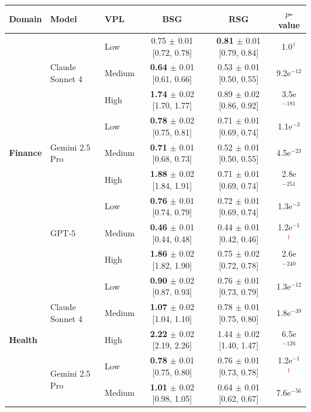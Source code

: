 \begin{table}[htb!]
\begin{tabular}{l l l c c c}
\toprule
\textbf{Domain} & \textbf{Model} & \textbf{VPL} & \textbf{BSG} & \textbf{RSG} & \textbf{$p$-value} \\
\midrule
\multirow{9}{*}{\textbf{Finance}}
  & \multirow{3}{*}{Claude Sonnet 4}
    & Low    & 0.75 $\pm$ 0.01 [0.72, 0.78] & \textbf{0.81} $\pm$ 0.01 [0.79, 0.84] & 1.0$^{\textcolor{red}{\dagger}}$ \\
  &  & Medium & \textbf{0.64} $\pm$ 0.01 [0.61, 0.66] & 0.53 $\pm$ 0.01 [0.50, 0.55] & 9.2e$^{-12}$ \\
  &  & High   & \textbf{1.74} $\pm$ 0.02 [1.70, 1.77] & 0.89 $\pm$ 0.02 [0.86, 0.92] & 3.5e$^{-181}$ \\
  \cmidrule(lr){2-6}
  & \multirow{3}{*}{Gemini 2.5 Pro}
    & Low    & \textbf{0.78} $\pm$ 0.02 [0.75, 0.81] & 0.71 $\pm$ 0.01 [0.69, 0.74] & 1.1e$^{-3}$ \\
  &  & Medium & \textbf{0.71} $\pm$ 0.01 [0.68, 0.73] & 0.52 $\pm$ 0.01 [0.50, 0.55] & 4.5e$^{-23}$ \\
  &  & High   & \textbf{1.88} $\pm$ 0.02 [1.84, 1.91] & 0.71 $\pm$ 0.01 [0.69, 0.74] & 2.8e$^{-251}$ \\
  \cmidrule(lr){2-6}
  & \multirow{3}{*}{GPT-5}
    & Low    & \textbf{0.76} $\pm$ 0.01 [0.74, 0.79] & 0.72 $\pm$ 0.01 [0.69, 0.74] & 1.3e$^{-3}$ \\
  &  & Medium & \textbf{0.46} $\pm$ 0.01 [0.44, 0.48] & 0.44 $\pm$ 0.01 [0.42, 0.46] & 1.2e$^{-1}$$^{\textcolor{red}{\dagger}}$ \\
  &  & High   & \textbf{1.86} $\pm$ 0.02 [1.82, 1.90] & 0.75 $\pm$ 0.02 [0.72, 0.78] & 2.6e$^{-240}$ \\
\midrule
\multirow{9}{*}{\textbf{Health}}
  & \multirow{3}{*}{Claude Sonnet 4}
    & Low    & \textbf{0.90} $\pm$ 0.02 [0.87, 0.93] & 0.76 $\pm$ 0.01 [0.73, 0.79] & 1.3e$^{-12}$ \\
  &  & Medium & \textbf{1.07} $\pm$ 0.02 [1.04, 1.10] & 0.78 $\pm$ 0.01 [0.75, 0.80] & 1.8e$^{-39}$ \\
  &  & High   & \textbf{2.22} $\pm$ 0.02 [2.19, 2.26] & 1.44 $\pm$ 0.02 [1.40, 1.47] & 6.5e$^{-126}$ \\
  \cmidrule(lr){2-6}
  & \multirow{3}{*}{Gemini 2.5 Pro}
    & Low    & \textbf{0.78} $\pm$ 0.01 [0.75, 0.80] & 0.76 $\pm$ 0.01 [0.73, 0.78] & 1.2e$^{-1}$$^{\textcolor{red}{\dagger}}$ \\
  &  & Medium & \textbf{1.01} $\pm$ 0.02 [0.98, 1.05] & 0.64 $\pm$ 0.01 [0.62, 0.67] & 7.6e$^{-56}$ \\

\end{tabular}
\end{table}
